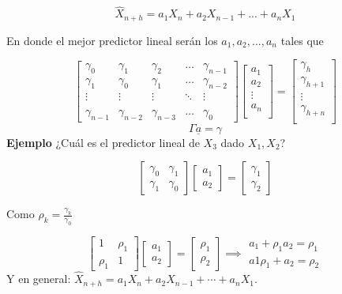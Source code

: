 \documentclass[
  a4paper,
  oneside,
  openany]{book}
\begin{document}
\[
\hat{X}_{n+h}=a_1X_n+a_2X_{n-1}+...+a_nX_1
\]

En donde el mejor predictor lineal serán los \(a_1,a_2,...,a_n\) tales que

\[
\begin{bmatrix}
    \gamma_0      & \gamma_1  & \gamma_2 & \dots & \gamma_{n-1}  \\
   \gamma_1       & \gamma_0  & \gamma_1  & \dots &\gamma_{n-2}  \\
      \vdots & \vdots & \vdots & \ddots & \vdots \\ \\
    \gamma_{n-1}       & \gamma_{n-2}  & \gamma_{n-3}  & \dots & \gamma_0 
\end{bmatrix}
\begin{bmatrix}
a_1\\
a_2\\
\vdots\\
a_n\\
\end{bmatrix}
=
\begin{bmatrix}
\gamma_h  \\
\gamma_{h+1}  \\
    \vdots\\
\gamma_{h+n}  \\
\end{bmatrix}
\]
\[\Gamma \underline{a}=\gamma\]
\textbf{Ejemplo} ¿Cuál es el predictor lineal de \(X_3\) dado \(X_1, X_2\)?

\[
\begin{bmatrix}
\gamma_0 & \gamma_1\\
\gamma_1 & \gamma_0
\end{bmatrix}
\begin{bmatrix}
a_1\\
a_2 
\end{bmatrix} = 
\begin{bmatrix}
\gamma_1\\
\gamma_2 
\end{bmatrix}
\]

Como \(\rho_k = \frac{\gamma_k}{\gamma_0}\)

\[
\begin{bmatrix}
1 & \rho_1\\
\rho_1 & 1
\end{bmatrix}
\begin{bmatrix}
a_1\\
a_2 
\end{bmatrix} = 
\begin{bmatrix}
\rho_1\\
\rho_2 
\end{bmatrix}
\implies
\begin{array}{l}
a_1+\rho_1a_2 = \rho_1\\
a1\rho_1+a_2 = \rho_2
\end{array}
\]
Y en general: \(\hat{X}_{n+h} = a_1X_n+a_2X_{n-1}+\cdots+a_nX_1\).
\end{document}
